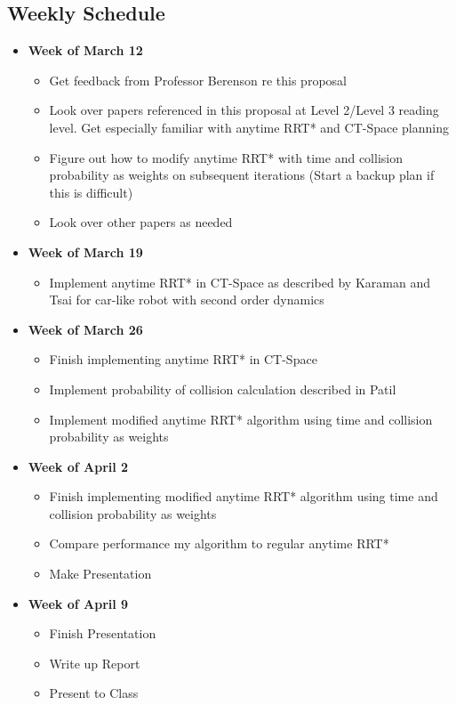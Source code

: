 \documentclass[12pt]{article}
\begin{document}
\subsection*{Weekly Schedule}
\begin{itemize}
\item \textbf{Week of March 12}
  \begin{itemize}
  \item Get feedback from Professor Berenson re this proposal
  \item Look over papers referenced in this proposal at Level 2/Level 3 reading level. Get especially familiar with anytime RRT* and CT-Space planning
  \item Figure out how to modify anytime RRT* with time and collision probability as weights on subsequent iterations (Start a backup plan if this is difficult)
  \item Look over other papers as needed
  \end{itemize}
  
\item \textbf{Week of March 19}
  \begin{itemize}
  \item Implement anytime RRT* in CT-Space as described by Karaman and Tsai for car-like robot with second order dynamics
  \end{itemize}
\item \textbf{Week of March 26}
  \begin{itemize}
  \item Finish implementing anytime RRT* in CT-Space
    \item Implement probability of collision calculation described in Patil
    \item Implement modified anytime RRT* algorithm using time and collision probability as weights
  \end{itemize}
\item \textbf{Week of April 2}

  \begin{itemize}
  \item Finish implementing modified anytime RRT* algorithm using time and collision probability as weights
    \item Compare performance my algorithm to regular anytime RRT*
    \item Make Presentation
  \end{itemize}
\item \textbf{Week of April 9}

  \begin{itemize}
    \item Finish Presentation
    \item Write up Report
    \item Present to Class
  \end{itemize}
\end{itemize}
\end{document}
